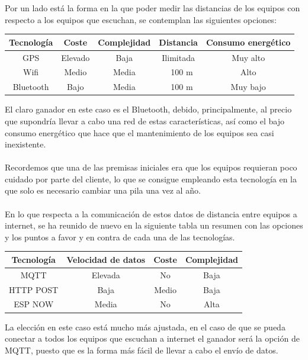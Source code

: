 \documentclass[paper=a4, fontsize=11pt,twoside]{scrartcl}	%
\begin{document}
        Por un lado está la forma en la que poder medir las distancias de los equipos con respecto a los equipos que escuchan,
        se contemplan las siguientes opciones:
        \begin{center}
            \begin{tabular}{|c | c| c| c| c |} 
            \hline
            Tecnología  & Coste  & Complejidad & Distancia & Consumo energético \\ [0.5ex] 
            \hline
            GPS& Elevado& Baja & Ilimitada& Muy alto\\
            Wifi& Medio& Media & ~ 100 m & Alto\\ 
            Bluetooth& Bajo& Media & ~ 100 m & Muy bajo\\ 
            \hline
            \end{tabular}
        \end{center}   
        El claro ganador en este caso es el Bluetooth, debido, principalmente, al precio que supondría llevar a cabo una red de estas 
        características, así como el bajo consumo energético que hace que el mantenimiento de los equipos sea casi inexistente.
        \paragraph{}
        Recordemos que una de las premisas iniciales era que los equipos requieran poco cuidado por parte del cliente, 
        lo que se consigue empleando esta tecnología en la que solo es necesario cambiar una pila una vez al año.
        \paragraph{}
        En lo que respecta a la comunicación de estos datos de distancia entre equipos a internet, se ha reunido de nuevo en la 
        siguiente tabla un resumen con las opciones y los puntos a favor y en contra de cada una de las tecnologías.
        \begin{center}
            \begin{tabular}{||c | c| c| c||} 
            \hline
            Tecnología  & Velocidad de datos & Coste & Complejidad \\ [0.5ex] 
            \hline
            MQTT& Elevada  & No & Baja\\
            HTTP POST& Baja & Medio & Baja\\ 
            ESP NOW& Media & No & Alta\\ 
            \hline
            \end{tabular}
        \end{center}   
        La elección en este caso está mucho más ajustada, en el caso de que se pueda conectar a todos los equipos que 
        escuchan a internet el ganador será la opción de MQTT, puesto que es la forma más fácil de llevar a cabo el envío de datos.
\end{document}
